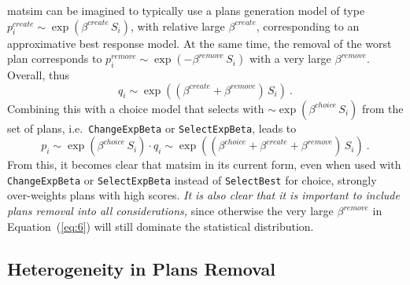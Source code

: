 
\gls{matsim} can be imagined to typically use a plans generation model of type $p^{create}_i \sim \exp( \beta^{create}\, S_i )$, with relative large $\beta^{create}$, corresponding to an approximative best response model.
%
At the same time, the removal of the worst plan corresponds to $p^{remove}_i \sim \exp( - \beta^{remove} \, S_i)$ with a very large $\beta^{remove}$.  Overall, thus
\[
q_i \sim \exp( (\beta^{create}+ \beta^{remove}) \, S_i ) \ .
\]
Combining this with a choice model that selects with $\sim \exp( \beta^{choice} \, S_i )$ from the set of plans, i.e.\ \lstinline{ChangeExpBeta} or \lstinline{SelectExpBeta}, leads to
\begin{equation}
p_i \sim \exp( \beta^{choice} \, S_i) \cdot q_i
%
\sim \exp( (\beta^{choice} + \beta^{create}+ \beta^{remove}) \, S_i ) \ .
\label{eq:6}
\end{equation}
From this, it becomes clear that \gls{matsim} in its current form, even when used with \lstinline{ChangeExpBeta} or \lstinline{SelectExpBeta} instead of \lstinline{SelectBest} for choice, strongly over-weights plans with high scores.  \emph{It is also clear that it is important to include plans removal into all considerations,} since otherwise the very large $\beta^{remove}$ in Equation~(\ref{eq:6}) will still dominate the statistical distribution.

\subsection{Heterogeneity in Plans Removal}

